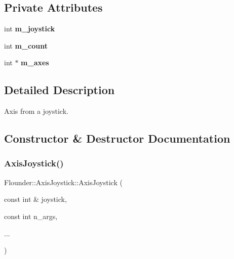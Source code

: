 \subsection*{Private Attributes}
\begin{DoxyCompactItemize}
\item 
\mbox{\label{class_flounder_1_1_axis_joystick_a8c4605e04a9d0a7865bf4cb4c4d8e8dd}} 
int {\bfseries m\+\_\+joystick}
\item 
\mbox{\label{class_flounder_1_1_axis_joystick_a2b9465dc1e1dcbbe9231bbdc4ad0e818}} 
int {\bfseries m\+\_\+count}
\item 
\mbox{\label{class_flounder_1_1_axis_joystick_af23d01d54cf8ed268263e7fac970b848}} 
int $\ast$ {\bfseries m\+\_\+axes}
\end{DoxyCompactItemize}


\subsection{Detailed Description}
Axis from a joystick. 



\subsection{Constructor \& Destructor Documentation}
\mbox{\label{class_flounder_1_1_axis_joystick_af9bb9c79c8f37c42aaec9e3f52094e46}} 
\subsubsection{\texorpdfstring{Axis\+Joystick()}{AxisJoystick()}}
{\footnotesize\ttfamily Flounder\+::\+Axis\+Joystick\+::\+Axis\+Joystick (\begin{DoxyParamCaption}\item[{const int \&}]{joystick,  }\item[{const int}]{n\+\_\+args,  }\item[{}]{... }\end{DoxyParamCaption})}



